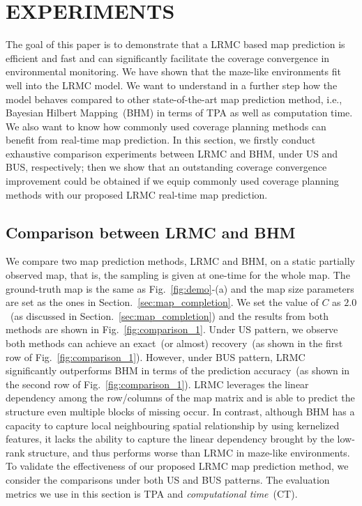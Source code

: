 \section{EXPERIMENTS}
The goal of this paper is to demonstrate that a LRMC based map prediction is efficient and fast and can significantly facilitate the coverage convergence in environmental monitoring. We have shown that the maze-like environments fit well into the LRMC model. We want to understand in a further step how the model behaves compared to other state-of-the-art map prediction method, i.e., Bayesian Hilbert Mapping~(BHM) in terms of TPA as well as computation time. We also want to know how commonly used coverage planning methods can benefit from real-time map prediction. In this section, we firstly conduct exhaustive comparison experiments between LRMC and BHM, under US and BUS, respectively; then we show that an outstanding coverage convergence improvement could be obtained if we equip commonly used coverage planning methods with our proposed LRMC real-time map prediction.

\subsection{Comparison between LRMC and BHM}
We compare two map prediction methods, LRMC and BHM, on a static partially observed map, that is, the sampling is given at one-time for the whole map. The ground-truth map is the same as Fig.~\ref{fig:demo}-(a) and the map size parameters are set as the ones in Section.~\ref{sec:map_completion}. We set the value of $C$ as $2.0$~(as discussed in Section.~\ref{sec:map_completion}) and the results from both methods are shown in Fig.~\ref{fig:comparison_1}. Under US pattern, we observe both methods can achieve an exact~(or almost) recovery~(as shown in the first row of Fig.~\ref{fig:comparison_1}). However, under BUS pattern, LRMC significantly outperforms BHM in terms of the prediction accuracy~(as shown in the second row of Fig.~\ref{fig:comparison_1}). LRMC leverages the linear dependency among the row/columns of the map matrix and is able to predict the structure even multiple blocks of missing occur. In contrast, although BHM has a capacity to capture local neighbouring spatial relationship by using kernelized features, it lacks the ability to capture the linear dependency brought by the low-rank structure, and thus performs worse than LRMC in maze-like environments. To validate the effectiveness of our proposed LRMC map prediction method, we consider the comparisons under both US and BUS patterns. The evaluation metrics we use in this section is TPA and \textit{computational time}~(CT). 

